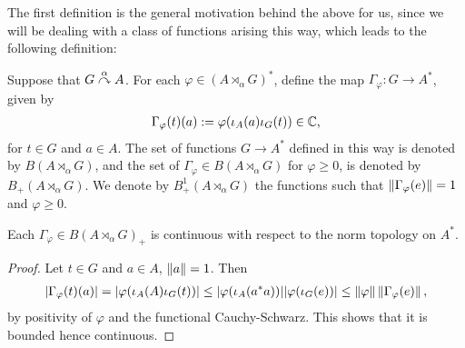 The first definition is the general motivation behind the above for us, since we will be dealing with a class of functions arising this way, which leads to the following definition:
\begin{definition}
Suppose that $G \stackrel{\alpha}{\curvearrowright} A$. For each $\varphi \in (A \rtimes_\alpha G)^*$, define the map $\Gamma_\varphi \colon G \to A^*$, given by
\begin{align*}
	\Gamma_\varphi(t)(a) :=\varphi(\iota_A(a) \iota_G(t)) \in \mathbb{C},
\end{align*}
for $t \in G $ and $a \in A$. The set of functions $G \to A^*$ defined in this way is denoted by $B(A \rtimes_ \alpha G)$, and the set of $\Gamma_\varphi \in B(A \rtimes_ \alpha G)$ for $\varphi \geq 0$,  is denoted by $B_+(A \rtimes_\alpha G)$. We denote by $B_+^1(A \rtimes_\alpha G)$ the functions such that $\left\lVert \Gamma_\varphi (e) \right\rVert = 1$ and $\varphi \geq 0$. 
\end{definition}
\begin{lemma}
	Each $\Gamma_\varphi \in B(A \rtimes_\alpha G)_+$ is continuous with respect to the norm topology on $A^*$.
\end{lemma}
\begin{proof}
	Let $t \in G$ and $a \in A$, $\left\lVert a \right\rVert = 1$. Then
	\begin{align*}
		|\Gamma_\varphi(t)(a)| = |\varphi(\iota_A(A) \iota_G(t))|  \leq |\varphi(\iota_A(a^*a))| | \varphi(\iota_G(e))| \leq  \left\lVert \varphi \right\rVert  \left\lVert \Gamma_\varphi(e) \right\rVert,
	\end{align*}
	by positivity of $\varphi$ and the functional Cauchy-Schwarz. This shows that it is bounded hence continuous.
\end{proof}
